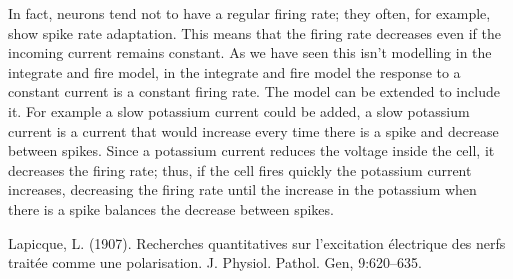 \documentclass[12pt]{article}
\begin{document}
In fact, neurons tend not to have a regular firing rate; they often,
for example, show spike rate adaptation. This means that the firing
rate decreases even if the incoming current remains constant. As we
have seen this isn't modelling in the integrate and fire model, in the
integrate and fire model the response to a constant current is a
constant firing rate. The model can be extended to include it. For
example a slow potassium current could be added, a slow potassium
current is a current that would increase every time there is a spike
and decrease between spikes. Since a potassium current reduces the
voltage inside the cell, it decreases the firing rate; thus, if the
cell fires quickly the potassium current increases, decreasing the
firing rate until the increase in the potassium when there is a spike
balances the decrease between spikes.

\begin{thebibliography}{99}
Lapicque, L. (1907). 
\newblock Recherches quantitatives sur l'excitation électrique des nerfs traitée comme une polarisation. 
\newblock J. Physiol. Pathol. Gen, 9:620--635.
\end{thebibliography}
\end{document}
